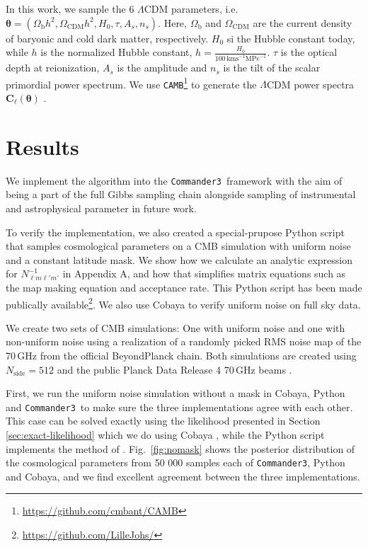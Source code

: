 \documentclass[twocolumn]{../common/aa}
\def\commanderthree{\texttt{Commander3}}
\begin{document}
In this work, we sample the 6 $\Lambda$CDM parameters, i.e. $\boldsymbol{\theta}=(\Omega_{\textrm{b}}h^2, \Omega_{\textrm{CDM}}h^2, H_0, \tau, A_s, n_s)$. Here, $\Omega_\mathrm{b}$ and $\Omega_\mathrm{CDM}$ are the current density of baryonic and cold dark matter, respectively. $H_0$ si the Hubble constant today, while $h$ is the normalized Hubble constant, $h=\frac{H_0}{100\,\mathrm{km s}^{-1} \mathrm{MPc}^{-1}}$. $\tau$ is the optical depth at reionization, $A_s$ is the amplitude and $n_s$ is the tilt of the scalar primordial power spectrum. We use \texttt{CAMB}\footnote{\url{https://github.com/cmbant/CAMB}} to generate the $\Lambda$CDM power spectra $\boldsymbol{C}_{\ell}(\boldsymbol{\theta})$ \citep{Lewis:1999bs}.


\section{Results}
\label{sec:results}

We implement the algorithm into the \commanderthree\ framework with the aim of being a part of the full Gibbs sampling chain alongside sampling of instrumental and astrophysical parameter in future work.

To verify the implementation, we also created a special-prupose Python script that samples cosmological parameters on a CMB simulation with uniform noise and a constant latitude mask. We show how we calculate an analytic expression for $N^{-1}_{\ell m \ell' m'}$ in Appendix A, and how that simplifies matrix equations such as the map making equation and acceptance rate. This Python script has been made publically available\footnote{\url{https://github.com/LilleJohs/}}. We also use Cobaya \citep{Torrado:2020dgo} to verify uniform noise on full sky data.

We create two sets of CMB simulations: One with uniform noise and one with non-uniform noise using a realization of a randomly picked RMS noise map of the 70\,GHz from the official BeyondPlanck chain. Both simulations are created using $N_{\textrm{side}}=512$ and the public Planck Data Release 4 70\,GHz beams \citep{npipe}.

First, we run the uniform noise simulation without a mask in Cobaya, Python and \commanderthree\ to make sure the three implementations agree with each other. This case can be solved exactly using the likelihood presented in Section \ref{sec:exact-likelihood} which we do using Cobaya \citep{Torrado:2020dgo}, while the Python script implements the method of \citet{racine:2016}. Fig.~\ref{fig:nomask} shows the posterior distribution of the cosmological parameters from 50 000 samples each of \commanderthree, Python and Cobaya, and we find excellent agreement between the three implementations.
\end{document}
